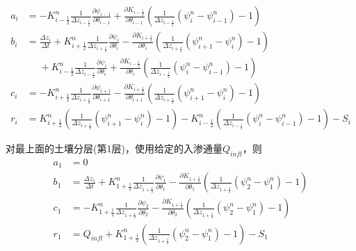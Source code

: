 \begin{equation}
\begin{aligned}
 a_i &= - K_{i-\frac{1}{2}}^{n} \frac{1}{\Delta z_{i-\frac{1}{2}}}
     \frac{\partial \psi_{i-1}}{\partial \theta_{i-1}}+\frac{\partial K_{i-\frac{1}{2}}}
     {\partial \theta_{i-1}}\left(\frac{1}{\Delta z_{i-\frac{1}{2}}}\left(\psi_{i}^{n}-\psi_{i-1}^{n}\right)-1\right) \\
b_i &= \frac{\Delta z_{i}}{\Delta t}+K_{i+\frac{1}{2}}^{n} \frac{1}{\Delta z_{i+\frac{1}{2}}} 
      \frac{\partial \psi_{i}}{\partial \theta_{i}}-\frac{\partial K_{i+\frac{1}{2}}}{\partial \theta_{i}}
      \left(\frac{1}{\Delta z_{i+\frac{1}{2}}}\left(\psi_{i+1}^{n}-\psi_{i}^{n}\right)-1\right) \\
&\mathrel{\phantom{=}}+K_{i-\frac{1}{2}}^{n} \frac{1}{\Delta z_{i-\frac{1}{2}}} \frac{\partial \psi_{i}}{\partial 
       \theta_{i}}+\frac{\partial K_{i-\frac{1}{2}}}{\partial \theta_{i}}\left(\frac{1}{\Delta z_{i-\frac{1}{2}}}\left(\psi_{i}^{n}-\psi_{i-1}^{n}\right)-1\right) \\ 
c_i &= - K_{i+\frac{1}{2}}^{n} \frac{1}{\Delta z_{i+\frac{1}{2}}} 
       \frac{\partial \psi_{i+1}}{\partial \theta_{i+1}} - \frac{\partial K_{i+\frac{1}{2}}}{\partial \theta_{i+1}}\left(\frac{1}
       {\Delta z_{i+\frac{1}{2}}}\left(\psi_{i+1}^{n}-\psi_{i}^{n}\right)-1\right) \\ 
r_i &= K_{i+\frac{1}{2}}^{n}
       \left(\frac{1}{\Delta z_{i+\frac{1}{2}}}\left(\psi_{i+1}^{n}-\psi_{i}^{n}\right)-1\right)-K_{i-\frac{1}{2}}^{n}
       \left(\frac{1}{\Delta z_{i-\frac{1}{2}}}\left(\psi_{i}^{n}-\psi_{i-1}^{n}\right)-1\right)-S_{i}
\end{aligned}
\end{equation}

对最上面的土壤分层(第1层)，使用给定的入渗通量$Q_{infl}$，则
\begin{equation}
\begin{aligned}
a_1 &= 0 \\
b_1 &= \frac{\Delta z_1}{\Delta t}+K_{1+\frac{1}{2}}^{n} 
    \frac{1}{\Delta z_{1+\frac{1}{2}}} \frac{\partial \psi_{1}}{\partial \theta_{1}}-\frac{\partial K_{1+\frac{1}{2}}}{\partial \theta_{1}}\left(\frac{1}{\Delta z_{1+\frac{1}{2}}}
    \left(\psi_{2}^{n}-\psi_{1}^{n}\right)-1\right) \\
c_1 &= -K_{1+\frac{1}{2}}^{n} \frac{1}{\Delta z_{1+\frac{1}{2}}} 
    \frac{\partial \psi_{2}}{\partial \theta_{2}}-\frac{\partial K_{1+\frac{1}{2}}}{\partial \theta_{2}}\left(\frac{1}{\Delta z_{1+\frac{1}{2}}}
    \left(\psi_{2}^{n}-\psi_{1}^{n}\right)-1\right) \\ 
r_1 &= Q_{infl}+K_{1+\frac{1}{2}}^{n}
    \left(\frac{1}{\Delta z_{1+\frac{1}{2}}}\left(\psi_{2}^{n}-\psi_{1}^{n}\right)-1\right)-S_{1}
\end{aligned}
\end{equation}

